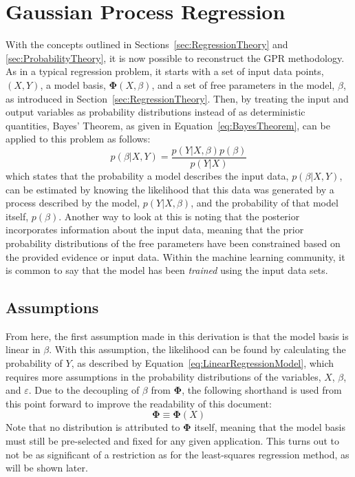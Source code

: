 \documentclass{article}
\begin{document}
\section{Gaussian Process Regression}
\label{sec:GaussianProcessRegression}

With the concepts outlined in Sections~\ref{sec:RegressionTheory} and \ref{sec:ProbabilityTheory}, it is now possible to reconstruct the GPR methodology. As in a typical regression problem, it starts with a set of input data points, $\left(X,Y\right)$, a model basis, $\mathbf{\Phi}\!\left(X,\beta\right)$, and a set of free parameters in the model, $\beta$, as introduced in Section~\ref{sec:RegressionTheory}. Then, by treating the input and output variables as probability distributions instead of as deterministic quantities, Bayes' Theorem, as given in Equation~\eqref{eq:BayesTheorem}, can be applied to this problem as follows:
\begin{equation}
\label{eq:RegressionBayesTheorem}
	p\!\left(\beta|X,Y\right) = \frac{p\!\left(Y|X,\beta\right) p\!\left(\beta\right)}{p\!\left(Y|X\right)}
\end{equation}
which states that the probability a model describes the input data, $p\!\left(\beta|X,Y\right)$, can be estimated by knowing the likelihood that this data was generated by a process described by the model, $p\!\left(Y|X,\beta\right)$, and the probability of that model itself, $p\!\left(\beta\right)$. Another way to look at this is noting that the posterior incorporates information about the input data, meaning that the prior probability distributions of the free parameters have been constrained based on the provided evidence or input data. Within the machine learning community, it is common to say that the model has been \emph{trained} using the input data sets.

\subsection{Assumptions}
\label{subsec:GPRAssumptions}

From here, the first assumption made in this derivation is that the model basis is linear in $\beta$. With this assumption, the likelihood can be found by calculating the probability of $Y$, as described by Equation~\eqref{eq:LinearRegressionModel}, which requires more assumptions in the probability distributions of the variables, $X$, $\beta$, and $\varepsilon$. Due to the decoupling of $\beta$ from $\mathbf{\Phi}$, the following shorthand is used from this point forward to improve the readability of this document:
\begin{equation}
\label{eq:ModelBasisShorthand}
	\mathbf{\Phi} \equiv \mathbf{\Phi}\!\left(X\right)
\end{equation}
Note that no distribution is attributed to $\mathbf{\Phi}$ itself, meaning that the model basis must still be pre-selected and fixed for any given application. This turns out to not be as significant of a restriction as for the least-squares regression method, as will be shown later.
\end{document}
